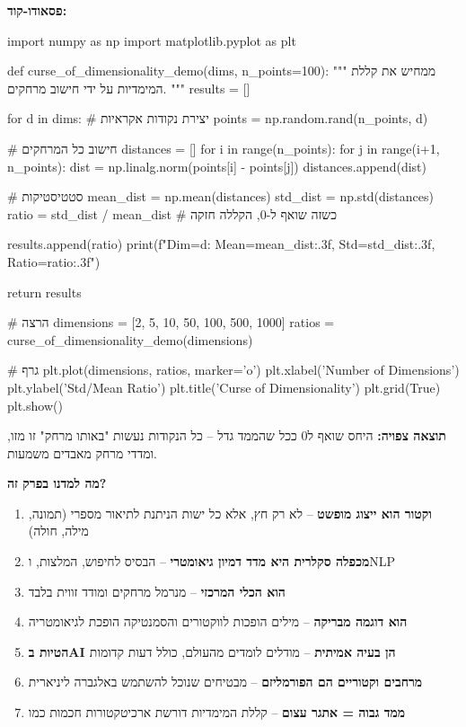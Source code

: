 \textbf{פסאודו-קוד:}

\begin{pythonbox}
import numpy as np
import matplotlib.pyplot as plt

def curse_of_dimensionality_demo(dims, n_points=100):
    """
    ממחיש את קללת המימדיות על ידי חישוב מרחקים.
    """
    results = []
    
    for d in dims:
        # יצירת נקודות אקראיות
        points = np.random.rand(n_points, d)
        
        # חישוב כל המרחקים
        distances = []
        for i in range(n_points):
            for j in range(i+1, n_points):
                dist = np.linalg.norm(points[i] - points[j])
                distances.append(dist)
        
        # סטטיסטיקות
        mean_dist = np.mean(distances)
        std_dist = np.std(distances)
        ratio = std_dist / mean_dist  # כשזה שואף ל-0, הקללה חזקה
        
        results.append(ratio)
        print(f"Dim={d}: Mean={mean_dist:.3f}, Std={std_dist:.3f}, Ratio={ratio:.3f}")
    
    return results

# הרצה
dimensions = [2, 5, 10, 50, 100, 500, 1000]
ratios = curse_of_dimensionality_demo(dimensions)

# גרף
plt.plot(dimensions, ratios, marker='o')
plt.xlabel('Number of Dimensions')
plt.ylabel('Std/Mean Ratio')
plt.title('Curse of Dimensionality')
plt.grid(True)
plt.show()
\end{pythonbox}

\textbf{תוצאה צפויה:} היחס שואף ל\en{-}\num{0} ככל שהממד גדל – כל הנקודות נעשות "באותו מרחק" זו מזו, ומדדי מרחק מאבדים משמעות.


\textbf{מה למדנו בפרק זה?}

\begin{enumerate}
\item \textbf{וקטור הוא ייצוג מופשט} – לא רק חץ, אלא כל ישות הניתנת לתיאור מספרי (תמונה, מילה, חולה)
\item \textbf{מכפלה סקלרית היא מדד דמיון גיאומטרי} – הבסיס לחיפוש, המלצות, ו\en{-}NLP
\item \textbf{ הוא הכלי המרכזי} – מנרמל מרחקים ומודד זווית בלבד
\item \textbf{ הוא דוגמה מבריקה} – מילים הופכות לווקטורים והסמנטיקה הופכת לגיאומטריה
\item \textbf{הטיות ב\en{-}AI הן בעיה אמיתית} – מודלים לומדים מהעולם, כולל דעות קדומות
\item \textbf{מרחבים וקטוריים הם הפורמליזם} – מבטיחים שנוכל להשתמש באלגברה ליניארית
\item \textbf{ממד גבוה = אתגר עצום} – קללת המימדיות דורשת ארכיטקטורות חכמות כמו 
\end{enumerate}

